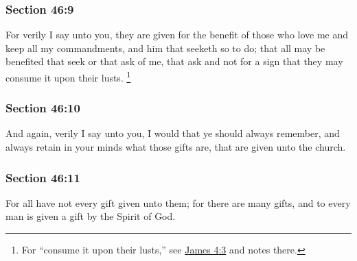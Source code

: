 	\subsubsection{Section 46:9} %
		\label{DC46-9}

		For verily I say unto you, they are given for the benefit of those who love me and keep all my commandments, and him that seeketh so to do; that all may be benefited that seek or that ask of me, that ask and not for a sign that they may consume it upon their lusts.%
			\footnote{%
				For ``consume it upon their lusts,'' see \hyperref[JAMES-4-3]{James 4:3} and notes there.
				}


	\subsubsection{Section 46:10} %
		\label{DC46-10}

		And again, verily I say unto you, I would that ye should always remember, and always retain in your minds what those gifts are, that are given unto the church.


	\subsubsection{Section 46:11} %
		\label{DC46-11}

		For all have not every gift given unto them; for there are many gifts, and to every man is given a gift by the Spirit of God.


